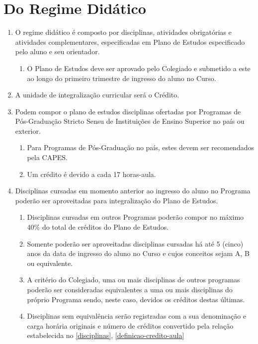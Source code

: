 \documentclass{article}
\newcommand{\singleitem}{\item[Parágrafo Único.]}
\begin{document}
\section{Do Regime Didático}
\begin{enumerate}
	\item O regime didático é composto por disciplinas, atividades obrigatórias e atividades complementares, especificadas em Plano de Estudos especificado pelo aluno e seu orientador.
	\begin{enumerate}
		\singleitem O Plano de Estudos deve ser aprovado pelo Colegiado e submetido a este ao longo do primeiro trimestre de ingresso do aluno no Curso.
	\end{enumerate}

	\item A unidade de integralização curricular será o Crédito.

	\item \label{disciplinas} Podem compor o plano de estudos disciplinas ofertadas por Programas de Pós-Graduação Stricto Sensu de Instituições de Ensino Superior no país ou exterior.
	\begin{enumerate}
		\item Para Programas de Pós-Graduação no país, estes devem ser recomendados pela CAPES.
		\item \label{definicao-credito-aula} Um crédito é devido a cada 17 horas-aula.
	\end{enumerate}

	\item Disciplinas cursadas em momento anterior ao ingresso do aluno no Programa poderão ser aproveitadas para integralização do Plano de Estudos.
	\begin{enumerate}
		\item Disciplinas cursadas em outros Programas poderão compor no máximo 40\% do total de créditos do Plano de Estudos.
		\item Somente poderão ser aproveitadas disciplinas cursadas há até 5 (cinco) anos da data de ingresso do aluno no Curso e cujos conceitos sejam A, B ou equivalente.
		\item A critério do Colegiado, uma ou mais disciplinas de outros programas poderão ser consideradas equivalentes a uma ou mais disciplinas do próprio Programa sendo, neste caso, devidos os créditos destas últimas.
		\item Disciplinas sem equivalência serão registradas com a sua denominação e carga horária originais e número de créditos convertido pela relação estabelecida no \ref{disciplinas}, \ref{definicao-credito-aula}
	\end{enumerate}


\end{enumerate}
\end{document}
